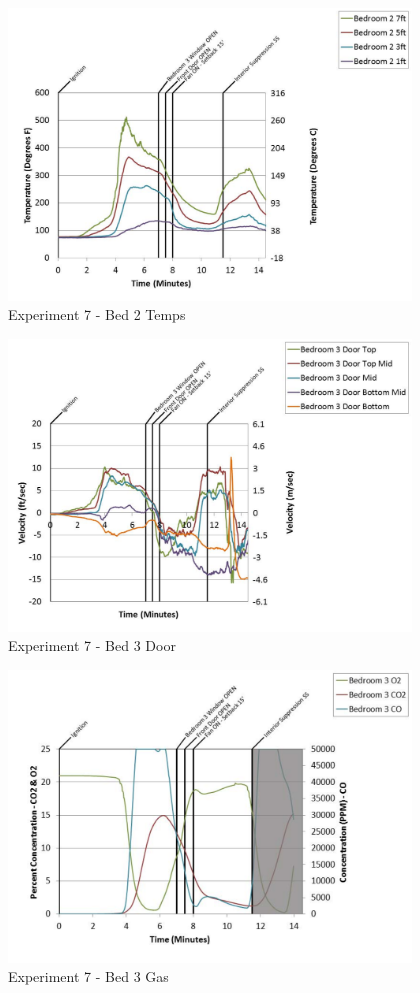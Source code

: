 \documentclass{article}
\begin{document}
\begin{appendices}
	\clearpage

	\begin{figure}[h!]
		\centering
		\includegraphics[height=3.05in]{0_Images/Results_Charts/Exp_7_Charts/Bed2Temps.pdf}
		\caption{Experiment 7 - Bed 2 Temps}
	\end{figure}
 

	\begin{figure}[h!]
		\centering
		\includegraphics[height=3.05in]{0_Images/Results_Charts/Exp_7_Charts/Bed3Door.pdf}
		\caption{Experiment 7 - Bed 3 Door}
	\end{figure}
 
	\clearpage

	\begin{figure}[h!]
		\centering
		\includegraphics[height=3.05in]{0_Images/Results_Charts/Exp_7_Charts/Bed3Gas.pdf}
		\caption{Experiment 7 - Bed 3 Gas}
	\end{figure}
 


\end{appendices}
\end{document}
